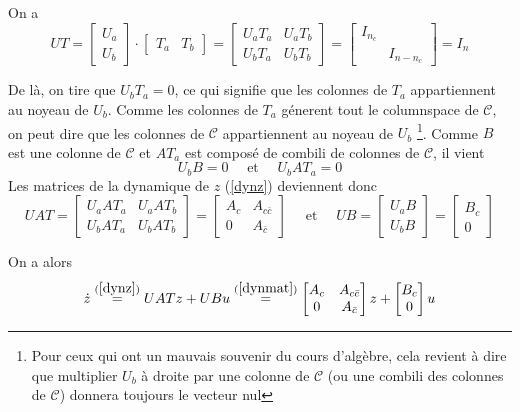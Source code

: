 \documentclass[10pt,letterpaper]{article}
\begin{document}
On a
$$UT =
\begin{bmatrix}
U_a \\ U_b
\end{bmatrix}
\cdot
\begin{bmatrix}
T_a & T_b
\end{bmatrix}
= 
\begin{bmatrix}
U_aT_a & U_aT_b \\
U_bT_a & U_bT_b
\end{bmatrix}
=
\begin{bmatrix}
I_{n_c}& \\
 & I_{n-n_c}
\end{bmatrix}
= I_n
$$

De là, on tire que $U_bT_a = 0$, ce qui signifie que les colonnes de $T_a$ appartiennent au  noyeau de $U_b$. Comme les colonnes de $T_a$ génerent tout le columnspace de $\mathcal{C}$, on peut dire que les colonnes de $\mathcal{C}$ appartiennent au noyeau de $U_b$ \footnote{Pour ceux qui ont un mauvais souvenir du cours d'algèbre, cela revient à dire que multiplier $U_b$ à droite par une colonne de $\mathcal{C}$ (ou une combili des colonnes de $\mathcal{C}$) donnera toujours le vecteur nul }.
Comme $B$ est une colonne de $\mathcal{C}$ et $AT_a$ est composé de combili de colonnes de $\mathcal{C}$, il vient
$$U_bB = 0 \quad \text{ et } \quad U_bAT_a = 0$$
Les matrices de la dynamique de $z$ (\ref{dynz}) deviennent donc
\begin{equation}
UAT = 
\begin{bmatrix}
U_aAT_a & U_aAT_b \\
U_bAT_a & U_bAT_b
\end{bmatrix}
=
\begin{bmatrix}
A_c & A_{c\bar{c}}\\
0 & A_{\bar{c}}
\end{bmatrix}
\quad 
\text{ et }
\quad
UB =
\begin{bmatrix}
U_aB \\ U_bB
\end{bmatrix}
=
\begin{bmatrix}
B_c \\ 0
\end{bmatrix}
\label{dynmat}
\end{equation}

On a alors
\begin{equation}
\dot{z} \overset{(\ref{dynz})}{=} UAT z + UB u 
\overset{(\ref{dynmat})}{=}
\begin{bmatrix}
A_c & A_{c\bar{c}}\\
0 & A_{\bar{c}}
\end{bmatrix}
z + 
\begin{bmatrix}
B_c \\ 0
\end{bmatrix}
u
\label{decomp}
\end{equation}
\end{document}

